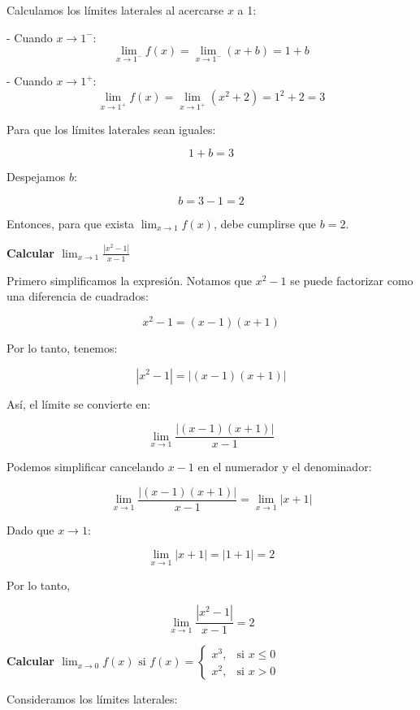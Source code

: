 \documentclass[answers]{exam} %
\begin{document}
\begin{questions}
\begin{solution}
		Calculamos los límites laterales al acercarse \(x\) a 1:

		- Cuando \( x \to 1^- \):
		\[
			\lim_{x \to 1^-} f(x) = \lim_{x \to 1^-} (x + b) = 1 + b
		\]

		- Cuando \( x \to 1^+ \):
		\[
			\lim_{x \to 1^+} f(x) = \lim_{x \to 1^+} (x^2 + 2) = 1^2 + 2 = 3
		\]

		Para que los límites laterales sean iguales:

		\[
			1 + b = 3
		\]

		Despejamos \(b\):

		\[
			b = 3 - 1 = 2
		\]

		Entonces, para que exista $\displaystyle \lim_{x\to{1}} f(x)$, debe cumplirse que \( b = 2 \).
		\vspace{0.5cm}
	\end{solution}


	\vspace{0.5cm}

	\question \large\textbf{Calcular $\displaystyle \lim_{x\to{1}} \frac{|x^2-1|}{x-1}$}
	\begin{solution}
		Primero simplificamos la expresión. Notamos que \(x^2 - 1\) se puede factorizar como una diferencia de cuadrados:

		\[
			x^2 - 1 = (x - 1)(x + 1)
		\]

		Por lo tanto, tenemos:

		\[
			|x^2 - 1| = |(x - 1)(x + 1)|
		\]

		Así, el límite se convierte en:

		\[
			\lim_{x\to{1}} \frac{|(x - 1)(x + 1)|}{x - 1}
		\]

		\vspace{1cm}

		Podemos simplificar cancelando \(x - 1\) en el numerador y el denominador:

		\[
			\lim_{x\to{1}} \frac{|(x - 1)(x + 1)|}{x - 1} = \lim_{x\to{1}} |x + 1|
		\]

		Dado que \(x \to 1\):

		\[
			\lim_{x\to{1}} |x + 1| = |1 + 1| = 2
		\]

		Por lo tanto,

		\[
			\lim_{x\to{1}} \frac{|x^2-1|}{x-1} = 2
		\]
	\end{solution}


	\vspace{0.5cm}

	\question \large\textbf{Calcular $\displaystyle \lim_{x\to{0}} f(x) \text{ si } f(x) =
			\begin{cases}
				x^3, & \text{si } x \leq 0 \\
				x^2, & \text{si } x > 0
			\end{cases}$}
	\begin{solution}
		Consideramos los límites laterales:


\end{solution}
\end{questions}
\end{document}
